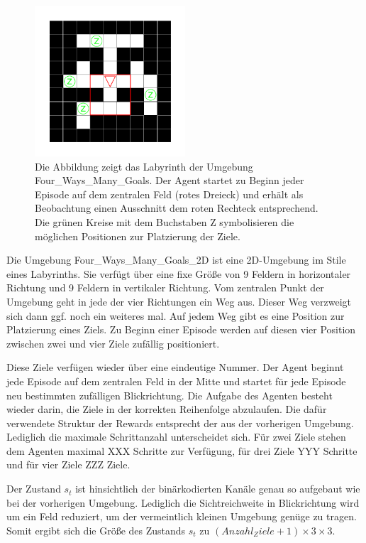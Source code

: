\begin{figure}[ht!]
  \centering
  \includegraphics[keepaspectratio,width=0.5\textwidth]{abbildungen/fwmg.pdf}
  \caption{Die Abbildung zeigt das Labyrinth der Umgebung \glqq Four\_Ways\_Many\_Goals\grqq{}. Der Agent startet zu Beginn jeder Episode auf dem zentralen Feld (rotes Dreieck) und erhält als Beobachtung einen Ausschnitt dem roten Rechteck entsprechend. Die grünen Kreise mit dem Buchstaben Z symbolisieren die möglichen Positionen zur Platzierung der Ziele.}
  \label{fig_fwmg_ep_start}
\end{figure}

Die Umgebung \glqq Four\_Ways\_Many\_Goals\_2D \grqq{} ist eine 2D-Umgebung im Stile eines Labyrinths. Sie verfügt über eine fixe Größe von 9 Feldern in horizontaler Richtung und 9 Feldern in vertikaler Richtung. Vom zentralen Punkt der Umgebung geht in jede der vier Richtungen ein Weg aus. Dieser Weg verzweigt sich dann ggf. noch ein weiteres mal. Auf jedem Weg gibt es eine Position zur Platzierung eines Ziels. Zu Beginn einer Episode werden auf diesen vier Position zwischen zwei und vier Ziele zufällig positioniert.

Diese Ziele verfügen wieder über eine eindeutige Nummer. Der Agent beginnt jede Episode auf dem zentralen Feld in der Mitte und startet für jede Episode neu bestimmten zufälligen Blickrichtung. Die Aufgabe des Agenten besteht wieder darin, die Ziele in der korrekten Reihenfolge abzulaufen. Die dafür verwendete Struktur der Rewards entsprecht der aus der vorherigen Umgebung. Lediglich die maximale Schrittanzahl unterscheidet sich. Für zwei Ziele stehen dem Agenten maximal XXX Schritte zur Verfügung, für drei Ziele YYY Schritte und für vier Ziele ZZZ Ziele.

Der Zustand $s_t$ ist hinsichtlich der binärkodierten Kanäle genau so aufgebaut wie bei der vorherigen Umgebung. Lediglich die Sichtreichweite in Blickrichtung wird um ein Feld reduziert, um der vermeintlich kleinen Umgebung genüge zu tragen. Somit ergibt sich die Größe des Zustands $s_t$ zu $(Anzahl_Ziele + 1) \times 3 \times 3$.

